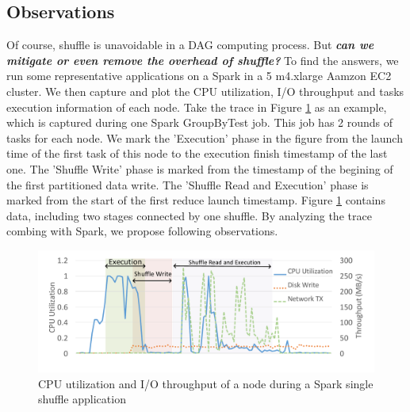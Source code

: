 \subsection{Observations} \label{observation}
Of course, shuffle is unavoidable in a DAG computing process. But \textbf{\textit{can we mitigate or even remove the overhead of shuffle?}} To find the answers, we run some representative applications on a Spark in a 5 m4.xlarge Aamzon EC2 cluster. We then capture and plot the CPU utilization, I/O throughput and tasks execution information of each node. Take the trace in Figure \ref{fig:util} as an example, which is captured during one Spark GroupByTest job. This job has 2 rounds of tasks for each node. We mark the 'Execution' phase in the figure from the launch time of the first task of this node to the execution finish timestamp of the last one. The 'Shuffle Write' phase is marked from the timestamp of the begining of the first partitioned data write. The 'Shuffle Read and Execution' phase is marked from the start of the first reduce launch timestamp.
Figure \ref{fig:util} contains data, including two stages connected by one shuffle. By analyzing the trace combing with Spark, we propose following observations.

\begin{figure}
	\includegraphics[width=\linewidth]{fig/util}
	\caption{CPU utilization and I/O throughput of a node during a Spark single shuffle application}
	\label{fig:util}
\end{figure}

